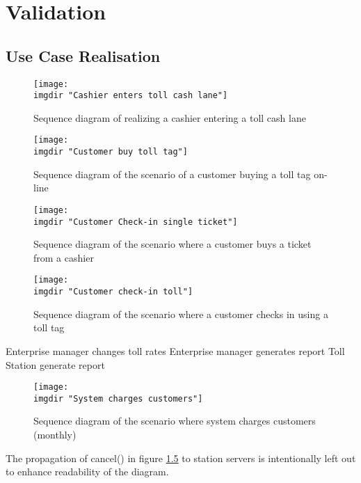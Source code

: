 \chapter{Validation}
\section{Use Case Realisation}


\begin{figure}
  \texttt{[image: \\imgdir "Cashier enters toll cash lane"]}
  \caption{Sequence diagram of realizing a cashier entering a toll cash lane}
  \label{fig:seq_diag:system_charges_customers}
\end{figure}

\begin{figure}
  \texttt{[image: \\imgdir "Customer buy toll tag"]}
  \caption{Sequence diagram of the scenario of a customer buying a toll tag on-line}
  \label{fig:seq_diag:customer_orders_toll_tag_online}
\end{figure}

\begin{figure}
  \texttt{[image: \\imgdir "Customer Check-in single ticket"]}
  \caption{Sequence diagram of the scenario where a customer buys a ticket from a cashier}
  \label{fig:seq_diag:customer_check_in_single_ticket}
\end{figure}

\begin{figure}
  \texttt{[image: \\imgdir "Customer check-in toll"]}
  \caption{Sequence diagram of the scenario where a customer checks in using a toll tag}
  \label{fig:seq_diag:customer_check_in_toll_tag}
\end{figure}

Enterprise manager changes toll rates
Enterprise manager generates report
Toll Station generate report

\begin{figure}
  \texttt{[image: \\imgdir "System charges customers"]}
  \caption{Sequence diagram of the scenario where system charges customers (monthly)}
  \label{fig:seq_diag:system_charges_customers}
\end{figure}
The propagation of cancel() in figure \ref{fig:seq_diag:system_charges_customers} to station servers is intentionally left out to enhance readability of the diagram.